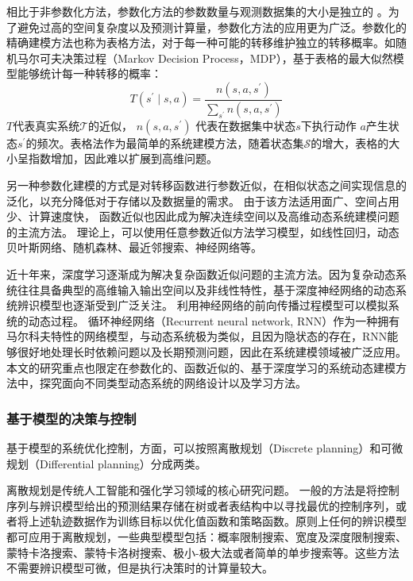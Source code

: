 相比于非参数化方法，参数化方法的参数数量与观测数据集的大小是独立的
。为了避免过高的空间复杂度以及预测计算量，参数化方法的应用更为广泛。参数化的精确建模方法也称为表格方法，对于每一种可能的转移维护独立的转移概率。如随机马尔可夫决策过程（Markov Decision Process，MDP），基于表格的最大似然模型能够统计每一种转移的概率：
\begin{equation}
    T\left(s^{\prime} \mid s, a\right)=\frac{n\left(s, a, s^{\prime}\right)}{\sum_{s^{\prime}} n\left(s, a, s^{\prime}\right)}
\end{equation}
$T$代表真实系统$\mathcal{\mathcal { T }}$的近似，
$n\left(s, a, s^{\prime}\right)$ 代表在数据集中状态$s$下执行动作 $a$产生状态$s^{\prime}$的频次。表格法作为最简单的系统建模方法，随着状态集$\mathcal{S}$的增大，表格的大小呈指数增加，因此难以扩展到高维问题。

另一种参数化建模的方式是对转移函数进行参数近似，在相似状态之间实现信息的泛化，以充分降低对于存储以及数据量的需求。
由于该方法适用面广、空间占用少、计算速度快，
函数近似也因此成为解决连续空间以及高维动态系统建模问题的主流方法。
理论上，可以使用任意参数近似方法学习模型，如线性回归\cite{silver2008sample}，动态贝叶斯网络、随机森林、最近邻搜索、神经网络\cite{werbos1989neural}等。

近十年来，深度学习逐渐成为解决复杂函数近似问题的主流方法。因为复杂动态系统往往具备典型的高维输入输出空间以及非线性特性，基于深度神经网络的动态系统辨识模型也逐渐受到广泛关注。
利用神经网络的前向传播过程模型可以模拟系统的动态过程\cite{temeng1995model, tan1996nonlinear}。
循环神经网络（Recurrent neural network, RNN）作为一种拥有马尔科夫特性的网络模型，与动态系统极为类似，且因为隐状态的存在，RNN能够很好地处理长时依赖问题以及长期预测问题，因此在系统建模领域被广泛应用\cite{delgado1995dynamic, zamarreno1998state}。
本文的研究重点也限定在参数化的、函数近似的、基于深度学习的系统动态建模方法中，探究面向不同类型动态系统的网络设计以及学习方法。

\subsubsection{基于模型的决策与控制}
基于模型的系统优化控制，方面，可以按照离散规划（Discrete planning）和可微规划（Differential planning）分成两类。

离散规划是传统人工智能和强化学习领域的核心研究问题。
一般的方法是将控制序列与辨识模型给出的预测结果存储在树或者表结构中以寻找最优的控制序列，或者将上述轨迹数据作为训练目标以优化值函数和策略函数。原则上任何的辨识模型都可应用于离散规划，一些典型模型包括：概率限制搜索\cite{lai2015giraffe}、宽度及深度限制搜索\cite{franccois2019combined}、蒙特卡洛搜索\cite{silver2008sample}、蒙特卡洛树搜索\cite{silver2017mastering}、极小-极大法\cite{baxter1999tdleaf}或者简单的单步搜索\cite{sutton1990integrated}等。这些方法不需要辨识模型可微，但是执行决策时的计算量较大。

